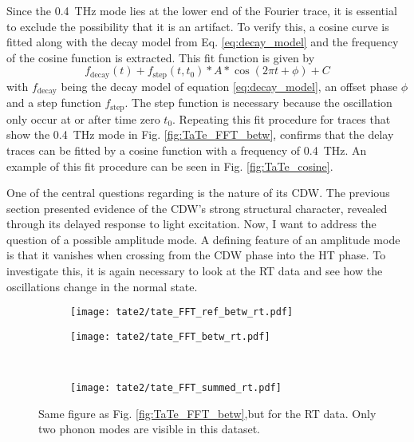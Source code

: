 Since the \qty{0.4}{\tera\hertz} mode lies at the lower end of the Fourier trace, it is essential to exclude the possibility that it is an artifact.
To verify this, a cosine curve is fitted along with the decay model from Eq. \ref{eq:decay_model} and the frequency of the cosine function is extracted. 
This fit function is given by
\begin{equation}
	f_\text{decay}(t) + f_\text{step}(t, t_0) * A * \cos(2\pi t+\phi) + C
\end{equation}
with $f_\text{decay}$ being the decay model of equation \ref{eq:decay_model}, an offset phase $\phi$ and a step function $f_\text{step}$.
The step function is necessary because the oscillation only occur at or after time zero $t_0$.
Repeating this fit procedure for traces that show the \qty{0.4}{\tera\hertz} mode in Fig. \ref{fig:TaTe_FFT_betw}, confirms that the delay traces can be fitted by a cosine function with a frequency of \qty{0.4}{\tera\hertz}.
An example of this fit procedure can be seen in Fig. \ref{fig:TaTe_cosine}.

One of the central questions regarding  is the nature of its CDW.
The previous section presented evidence of the CDW's strong structural character, revealed through its delayed response to light excitation.
Now, I want to address the question of a possible amplitude mode.
A defining feature of an amplitude mode is that it vanishes when crossing from the CDW phase into the HT phase.
To investigate this, it is again necessary to look at the RT data and see how the oscillations change in the normal state.

\begin{figure}[b!]
	\centering
	\begin{subfigure}[b]{0.33\textwidth}
		\texttt{[image: tate2/tate\_FFT\_ref\_betw\_rt.pdf]}
		\caption{}
	\end{subfigure}
	\begin{subfigure}[b]{0.66\textwidth}
		\texttt{[image: tate2/tate\_FFT\_betw\_rt.pdf]}
		\caption{}
	\end{subfigure}
	\\
	\begin{subfigure}[b]{0.33\textwidth}
		\texttt{[image: tate2/tate\_FFT\_summed\_rt.pdf]}
		\caption{}
	\end{subfigure}
	\caption{Same figure as Fig. \ref{fig:TaTe_FFT_betw},but for the RT data. Only two phonon modes are visible in this dataset.}
	\label{fig:TaTe_FFT_betw_rt}
\end{figure}

